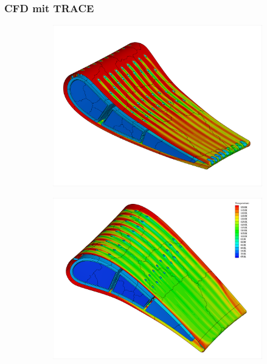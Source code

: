 \documentclass[8pt, aspectratio=169]{beamer}
\begin{document}
\begin{frame}
	\frametitle{CFD mit TRACE}
	\vspace{-1.5cm}\hspace{-0.5cm}
	\begin{figure}
		\begin{subfigure}{.49\textwidth}
			\centering
			\includegraphics[width=\textwidth, trim={50px 50px 50px 50px}, clip]{../../assets/ninacfd/pressureSide.png}
		\end{subfigure}
		\begin{subfigure}{.49\textwidth}
			\centering
			\includegraphics[width=\textwidth, trim={50px 50px 50px 50px}, clip]{../../assets/ninacfd/suctionSide.png}
		\end{subfigure}
	\end{figure}
\end{frame}
\end{document}
